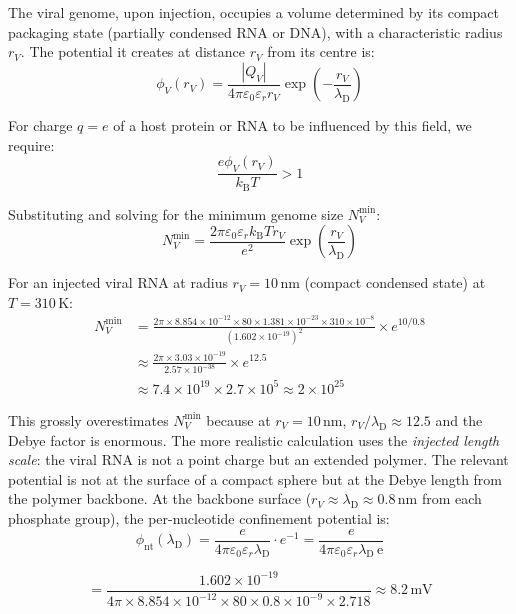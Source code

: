 \documentclass[11pt,twocolumn,a4paper]{article}
\theoremstyle{definition}
\theoremstyle{remark}
\newcommand{\kB}{k_{\mathrm{B}}}
\newcommand{\lD}{\lambda_{\mathrm{D}}}
\newcommand{\eps}{\varepsilon}
\newcommand{\epsz}{\varepsilon_{0}}
\newcommand{\abs}[1]{\left|#1\right|}
\begin{document}
The viral genome, upon injection, occupies a volume determined by its compact packaging state (partially condensed RNA or DNA), with a characteristic radius $r_V$. The potential it creates at distance $r_V$ from its centre is:
\begin{equation}
  \phi_V(r_V) = \frac{\abs{Q_V}}{4\pi \epsz \eps_r r_V} \exp\!\left(-\frac{r_V}{\lD}\right)
\end{equation}

For charge $q = e$ of a host protein or RNA to be influenced by this field, we require:
\begin{equation}
  \frac{e \phi_V(r_V)}{\kB T} > 1
\end{equation}

Substituting and solving for the minimum genome size $N_V^{\min}$:
\begin{equation}
  N_V^{\min} = \frac{2\pi \epsz \eps_r \kB T r_V}{e^2} \exp\!\left(\frac{r_V}{\lD}\right)
  \label{eq:Nmin}
\end{equation}

For an injected viral RNA at radius $r_V = 10$\,nm (compact condensed state) at $T = 310$\,K:
\begin{align}
  N_V^{\min} &= \frac{2\pi \times 8.854 \times 10^{-12} \times 80 \times 1.381 \times 10^{-23} \times 310 \times 10^{-8}}{(1.602 \times 10^{-19})^2} \times e^{10/0.8} \\
  &\approx \frac{2\pi \times 3.03 \times 10^{-19}}{2.57 \times 10^{-38}} \times e^{12.5} \\
  &\approx 7.4 \times 10^{19} \times 2.7 \times 10^5 \approx 2 \times 10^{25}
\end{align}

This grossly overestimates $N_V^{\min}$ because at $r_V = 10$\,nm, $r_V/\lD \approx 12.5$ and the Debye factor is enormous. The more realistic calculation uses the \emph{injected length scale}: the viral RNA is not a point charge but an extended polymer. The relevant potential is not at the surface of a compact sphere but at the Debye length from the polymer backbone. At the backbone surface ($r_V \approx \lD \approx 0.8$\,nm from each phosphate group), the per-nucleotide confinement potential is:
\begin{equation}
  \phi_{\mathrm{nt}}(\lD) = \frac{e}{4\pi \epsz \eps_r \lD} \cdot e^{-1} = \frac{e}{4\pi \epsz \eps_r \lD \, \mathrm{e}}
\end{equation}

\begin{equation}
  = \frac{1.602 \times 10^{-19}}{4\pi \times 8.854 \times 10^{-12} \times 80 \times 0.8 \times 10^{-9} \times 2.718} \approx 8.2\,\mathrm{mV}
\end{equation}
\end{document}
